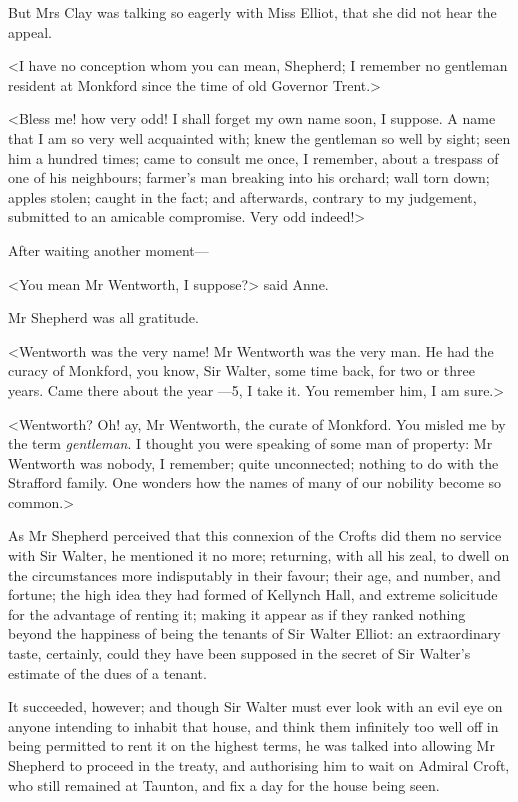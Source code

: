 But Mrs Clay was talking so eagerly with Miss Elliot, that she did not hear the appeal.

<I have no conception whom you can mean, Shepherd; I remember no gentleman resident at Monkford since the time of old Governor Trent.>

<Bless me! how very odd! I shall forget my own name soon, I suppose. A name that I am so very well acquainted with; knew the gentleman so well by sight; seen him a hundred times; came to consult me once, I remember, about a trespass of one of his neighbours; farmer's man breaking into his orchard; wall torn down; apples stolen; caught in the fact; and afterwards, contrary to my judgement, submitted to an amicable compromise. Very odd indeed!>

After waiting another moment—

<You mean Mr Wentworth, I suppose?> said Anne.

Mr Shepherd was all gratitude.

<Wentworth was the very name! Mr Wentworth was the very man. He had the curacy of Monkford, you know, Sir Walter, some time back, for two or three years. Came there about the year —5, I take it. You remember him, I am sure.>

<Wentworth? Oh! ay, Mr Wentworth, the curate of Monkford. You misled me by the term \textit{gentleman}. I thought you were speaking of some man of property: Mr Wentworth was nobody, I remember; quite unconnected; nothing to do with the Strafford family. One wonders how the names of many of our nobility become so common.>

As Mr Shepherd perceived that this connexion of the Crofts did them no service with Sir Walter, he mentioned it no more; returning, with all his zeal, to dwell on the circumstances more indisputably in their favour; their age, and number, and fortune; the high idea they had formed of Kellynch Hall, and extreme solicitude for the advantage of renting it; making it appear as if they ranked nothing beyond the happiness of being the tenants of Sir Walter Elliot: an extraordinary taste, certainly, could they have been supposed in the secret of Sir Walter's estimate of the dues of a tenant.

It succeeded, however; and though Sir Walter must ever look with an evil eye on anyone intending to inhabit that house, and think them infinitely too well off in being permitted to rent it on the highest terms, he was talked into allowing Mr Shepherd to proceed in the treaty, and authorising him to wait on Admiral Croft, who still remained at Taunton, and fix a day for the house being seen.

